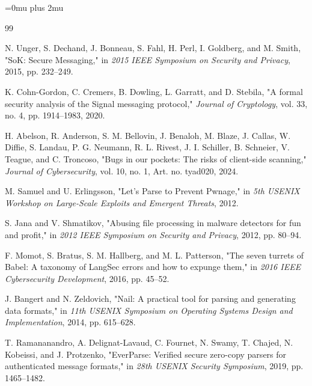 \begingroup
\sloppy
\Urlmuskip=0mu plus 2mu\relax
\begin{thebibliography}{99}
\fontsize{6.5}{7.0}\selectfont
\setlength{\itemsep}{0pt plus 0.2pt}

N. Unger, S. Dechand, J. Bonneau, S. Fahl, H. Perl, I. Goldberg, and
M. Smith, "SoK: Secure Messaging," in \emph{2015 IEEE Symposium on
Security and Privacy}, 2015, pp. 232--249.

K. Cohn-Gordon, C. Cremers, B. Dowling, L. Garratt, and D. Stebila,
"A formal security analysis of the Signal messaging protocol,"
\emph{Journal of Cryptology}, vol. 33, no. 4, pp. 1914--1983, 2020.

H. Abelson, R. Anderson, S. M. Bellovin, J. Benaloh, M. Blaze, J. Callas,
W. Diffie, S. Landau, P. G. Neumann, R. L. Rivest, J. I. Schiller,
B. Schneier, V. Teague, and C. Troncoso,
"Bugs in our pockets: The risks of client-side scanning,"
\emph{Journal of Cybersecurity}, vol. 10, no. 1, Art. no. tyad020, 2024.

M. Samuel and U. Erlingsson, "Let's Parse to Prevent Pwnage," in
\emph{5th USENIX Workshop on Large-Scale Exploits and Emergent Threats},
2012.

S. Jana and V. Shmatikov, "Abusing file processing in malware detectors
for fun and profit," in \emph{2012 IEEE Symposium on Security and Privacy},
2012, pp. 80--94.

F. Momot, S. Bratus, S. M. Hallberg, and M. L. Patterson,
"The seven turrets of Babel: A taxonomy of LangSec errors and how to
expunge them," in \emph{2016 IEEE Cybersecurity Development}, 2016,
pp. 45--52.

J. Bangert and N. Zeldovich, "Nail: A practical tool for parsing and
generating data formats," in \emph{11th USENIX Symposium on Operating
Systems Design and Implementation}, 2014, pp. 615--628.

T. Ramananandro, A. Delignat-Lavaud, C. Fournet, N. Swamy, T. Chajed,
N. Kobeissi, and J. Protzenko, "EverParse: Verified secure zero-copy
parsers for authenticated message formats," in \emph{28th USENIX Security
Symposium}, 2019, pp. 1465--1482.


\end{thebibliography}
